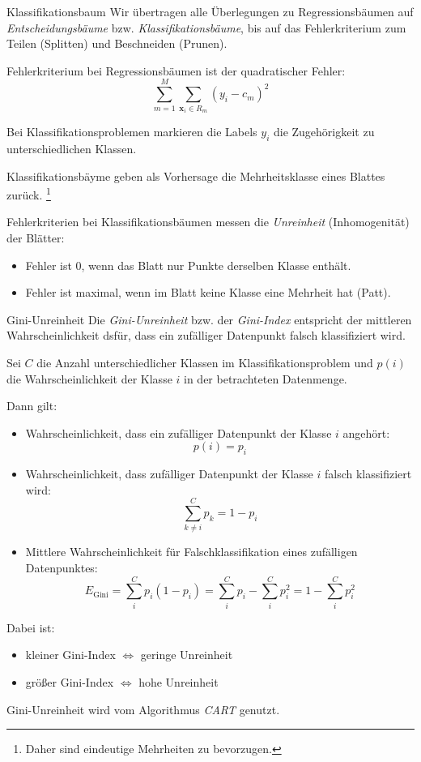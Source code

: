 \begin{defi}{Klassifikationsbaum}
    Wir übertragen alle Überlegungen zu Regressionsbäumen auf \emph{Entscheidungsbäume} bzw. \emph{Klassifikationsbäume}, bis auf das Fehlerkriterium zum Teilen (Splitten) und Beschneiden (Prunen).

    Fehlerkriterium bei Regressionsbäumen ist der quadratischer Fehler:
    \[
        \sum_{m=1}^M \sum_{\mathbf{x}_i \in R_m} \left( y_i - c_m \right)^2
    \]

    Bei Klassifikationsproblemen markieren die Labels $y_i$ die Zugehörigkeit zu unterschiedlichen Klassen.

    Klassifikationsbäyme geben als Vorhersage die Mehrheitsklasse eines Blattes zurück.
    \footnote{
        Daher sind eindeutige Mehrheiten zu bevorzugen.
    }

    Fehlerkriterien bei Klassifikationsbäumen messen die \emph{Unreinheit} (Inhomogenität) der Blätter:
    \begin{itemize}
        \item Fehler ist 0, wenn das Blatt nur Punkte derselben Klasse enthält.
        \item Fehler ist maximal, wenn im Blatt keine Klasse eine Mehrheit hat (Patt).
    \end{itemize}
\end{defi}

\begin{defi}{Gini-Unreinheit}
    Die \emph{Gini-Unreinheit} bzw. der \emph{Gini-Index} entspricht der mittleren Wahrscheinlichkeit dsfür, dass ein zufälliger Datenpunkt falsch klassifiziert wird.

    Sei $C$ die Anzahl unterschiedlicher Klassen im Klassifikationsproblem und $p(i)$ die Wahrscheinlichkeit der Klasse $i$ in der betrachteten Datenmenge.

    Dann gilt:
    \begin{itemize}
        \item Wahrscheinlichkeit, dass ein zufälliger Datenpunkt der Klasse $i$ angehört:
              \[
                  p(i) = p_i
              \]
        \item Wahrscheinlichkeit, dass zufälliger Datenpunkt der Klasse $i$ falsch klassifiziert wird:
              \[
                  \sum_{k \neq i}^C p_k = 1 - p_i
              \]
        \item Mittlere Wahrscheinlichkeit für Falschklassifikation eines zufälligen Datenpunktes:
              \[
                  E_\text{Gini} = \sum_i^C p_i (1 - p_i) = \sum_i^C p_i - \sum_i^C p_i^2 = 1 - \sum_i^C p_i^2
              \]
    \end{itemize}

    Dabei ist:
    \begin{itemize}
        \item kleiner Gini-Index $\iff$ geringe Unreinheit
        \item größer Gini-Index $\iff$ hohe Unreinheit
    \end{itemize}

    Gini-Unreinheit wird vom Algorithmus \emph{CART} genutzt.
\end{defi}

